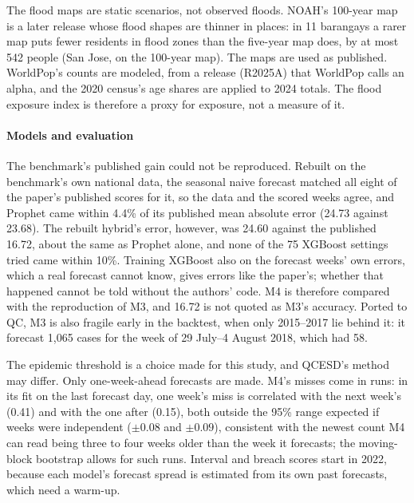 The flood maps are static scenarios, not observed floods. NOAH's 100-year map is a later release
whose flood shapes are thinner in places: in 11 barangays a rarer map puts fewer residents in
flood zones than the five-year map does, by at most 542 people (San Jose, on the 100-year map).
The maps are used as published. WorldPop's counts are modeled, from a release (R2025A) that
WorldPop calls an alpha, and the 2020 census's age shares are applied to 2024 totals. The flood
exposure index is therefore a proxy for exposure, not a measure of it.

\paragraph{Models and evaluation}
The benchmark's published gain could not be reproduced. Rebuilt on the benchmark's own national
data, the seasonal naive forecast matched all eight of the paper's published scores for it, so
the data and the scored weeks agree, and Prophet came within 4.4\% of its published mean
absolute error (24.73 against 23.68). The rebuilt hybrid's error, however, was 24.60 against
the published 16.72, about the same as Prophet alone, and none of the 75 XGBoost settings tried
came within 10\%. Training XGBoost also on the forecast weeks' own errors, which a real forecast
cannot know, gives errors like the paper's; whether that happened cannot be told without the
authors' code. M4 is therefore compared with the reproduction of M3, and 16.72 is not quoted as
M3's accuracy. Ported to QC, M3 is also fragile early in the backtest, when only 2015--2017 lie
behind it: it forecast 1,065 cases for the week of 29 July--4 August 2018, which had 58.

The epidemic threshold is a choice made for this study, and QCESD's method may differ. Only
one-week-ahead forecasts are made. M4's misses come in runs: in its fit on the last forecast day,
one week's miss is correlated with the next week's (0.41) and with the one after (0.15), both
outside the 95\% range expected if weeks were independent ($\pm0.08$ and $\pm0.09$), consistent
with the newest count M4 can read being three to four weeks older than the week it forecasts; the
moving-block bootstrap allows for such runs. Interval and breach scores start in 2022, because each model's forecast spread is
estimated from its own past forecasts, which need a warm-up.

